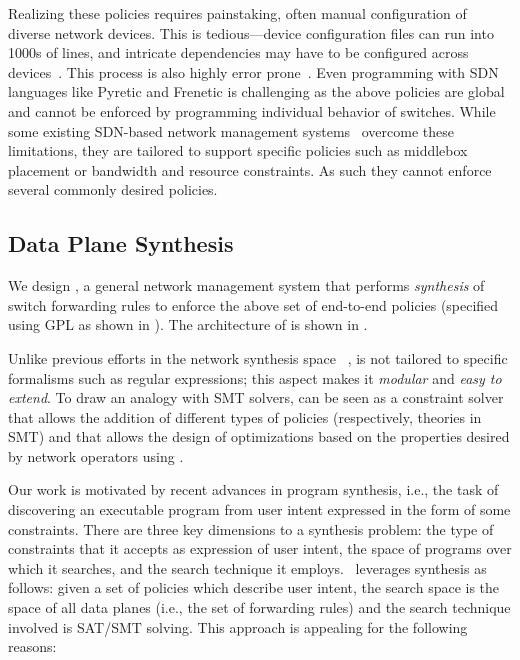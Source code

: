 \noindent Realizing these policies requires painstaking, often
manual configuration of diverse network devices. This is 
tedious---device configuration files can run into 1000s of lines, and
intricate dependencies may have to be configured across
devices~\cite{benson:complexity:nsdi2009,mpa-imc15}. This process is
also highly error prone~\cite{mpa-imc15}. Even programming with SDN
languages like Pyretic and Frenetic is challenging as the above policies
are global and cannot be enforced by programming individual behavior
of switches.  While some existing SDN-based network management
systems~\cite{simple,merlin,oneswitch} overcome these limitations,
they are tailored to support specific policies such as middlebox
placement or bandwidth and resource constraints. As such they cannot
enforce several commonly desired policies.


\subsection{Data Plane Synthesis} \label{sec:synthesis} 


We design \name, a general network management system that 
 performs {\em synthesis} of switch forwarding
rules to enforce the above set of end-to-end policies (specified using 
GPL as shown in ). The architecture of \name
is shown in . 

Unlike previous efforts in the network synthesis space ~\cite{netgen,merlin}, \Name is
not tailored to specific formalisms such as regular expressions; 
this aspect makes it {\em modular} and {\em easy to extend}.
To draw an analogy with SMT solvers, \Name can be seen as a constraint
solver that allows the addition of different types of policies
(respectively, theories in SMT) and that allows the design of
optimizations based on the properties desired by network
  operators using \Name. 
  
  Our work is motivated by recent advances in program synthesis, i.e.,
  the task of discovering an executable program from user intent
  expressed in the form of some constraints. There are three key
  dimensions to a synthesis problem: the type of constraints that it accepts as
  expression of user intent, the space of programs over which it
  searches, and the search technique it employs. 
\Name\ leverages synthesis as follows: given a set of
policies which describe user intent, the search space is the space of
all data planes (i.e., the set of forwarding rules) 
and the search technique involved
is SAT/SMT solving. This approach is appealing for the following reasons: 

